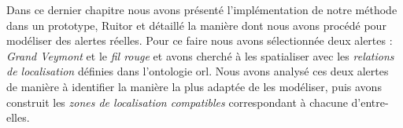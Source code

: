 Dans ce dernier chapitre nous avons présenté l'implémentation de notre
méthode dans un prototype, Ruitor et détaillé la manière dont nous
avons procédé pour modéliser des alertes réelles. Pour ce faire nous
avons sélectionnée deux alertes : \emph{Grand Veymont} et le \emph{fil
  rouge} et avons cherché à les spatialiser avec les \emph{relations
  de localisation} définies dans l'ontologie \ac{orl}. Nous avons
analysé ces deux alertes de manière à identifier la manière la plus
adaptée de les modéliser, puis avons construit les \emph{zones de
  localisation compatibles} correspondant à chacune d'entre-elles.
